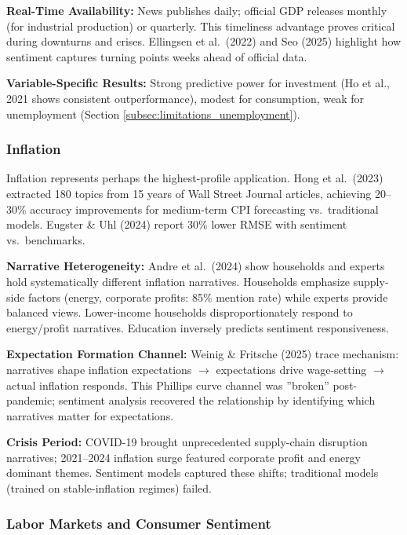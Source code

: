 \documentclass[12pt,a4paper]{article}
\begin{document}
\textbf{Real-Time Availability:} News publishes daily; official GDP releases monthly (for industrial production) or quarterly. This timeliness advantage proves critical during downturns and crises. Ellingsen et al.\ (2022) and Seo (2025) highlight how sentiment captures turning points weeks ahead of official data.

\textbf{Variable-Specific Results:} Strong predictive power for investment (Ho et al., 2021 shows consistent outperformance), modest for consumption, weak for unemployment (Section \ref{subsec:limitations_unemployment}).

\subsubsection{Inflation}

Inflation represents perhaps the highest-profile application. Hong et al.\ (2023) extracted 180 topics from 15 years of Wall Street Journal articles, achieving 20--30\% accuracy improvements for medium-term CPI forecasting vs.\ traditional models. Eugster \& Uhl (2024) report 30\% lower RMSE with sentiment vs.\ benchmarks.

\textbf{Narrative Heterogeneity:} Andre et al.\ (2024) show households and experts hold systematically different inflation narratives. Households emphasize supply-side factors (energy, corporate profits: 85\% mention rate) while experts provide balanced views. Lower-income households disproportionately respond to energy/profit narratives. Education inversely predicts sentiment responsiveness.

\textbf{Expectation Formation Channel:} Weinig \& Fritsche (2025) trace mechanism: narratives shape inflation expectations $\to$ expectations drive wage-setting $\to$ actual inflation responds. This Phillips curve channel was ''broken'' post-pandemic; sentiment analysis recovered the relationship by identifying which narratives matter for expectations.

\textbf{Crisis Period:} COVID-19 brought unprecedented supply-chain disruption narratives; 2021--2024 inflation surge featured corporate profit and energy dominant themes. Sentiment models captured these shifts; traditional models (trained on stable-inflation regimes) failed.

\subsubsection{Labor Markets and Consumer Sentiment}
\end{document}
